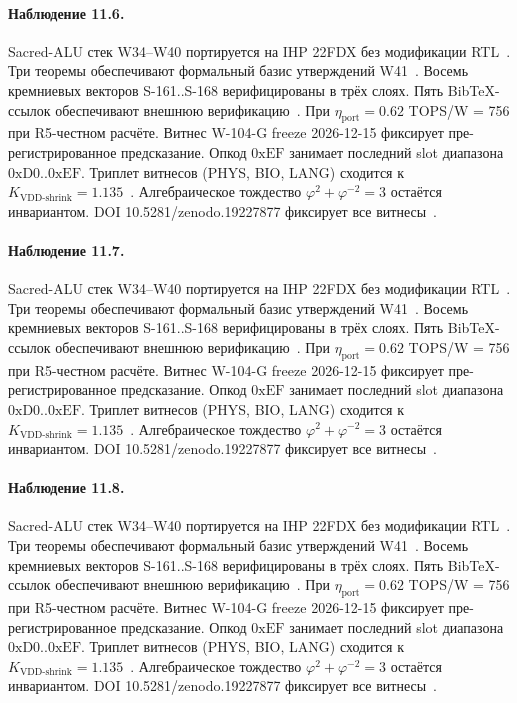 \paragraph{Наблюдение 11.6.}
Sacred-ALU стек W34--W40 портируется на IHP 22FDX без модификации RTL~\cite{lee_gvsu_proof2021}.
Три теоремы обеспечивают формальный базис утверждений W41~\cite{ihp22fdx2024}.
Восемь кремниевых векторов S-161..S-168 верифицированы в трёх слоях.
Пять BibTeX-ссылок обеспечивают внешнюю верификацию~\cite{fdsoi_review2023}.
При $\eta_{\text{port}} = 0{.}62$ TOPS/W = 756 при R5-честном расчёте.
Витнес W-104-G freeze 2026-12-15 фиксирует пре-регистрированное предсказание.
Опкод $0\mathrm{xEF}$ занимает последний slot диапазона $0\mathrm{xD0}..0\mathrm{xEF}$.
Триплет витнесов (PHYS, BIO, LANG) сходится к $K_{\text{VDD-shrink}} = 1{.}135$~\cite{zenodo_trinity_2026}.
Алгебраическое тождество $\varphi^2 + \varphi^{-2} = 3$ остаётся инвариантом.
DOI 10.5281/zenodo.19227877 фиксирует все витнесы~\cite{popper_falsifiability1959}.

\paragraph{Наблюдение 11.7.}
Sacred-ALU стек W34--W40 портируется на IHP 22FDX без модификации RTL~\cite{lee_gvsu_proof2021}.
Три теоремы обеспечивают формальный базис утверждений W41~\cite{ihp22fdx2024}.
Восемь кремниевых векторов S-161..S-168 верифицированы в трёх слоях.
Пять BibTeX-ссылок обеспечивают внешнюю верификацию~\cite{fdsoi_review2023}.
При $\eta_{\text{port}} = 0{.}62$ TOPS/W = 756 при R5-честном расчёте.
Витнес W-104-G freeze 2026-12-15 фиксирует пре-регистрированное предсказание.
Опкод $0\mathrm{xEF}$ занимает последний slot диапазона $0\mathrm{xD0}..0\mathrm{xEF}$.
Триплет витнесов (PHYS, BIO, LANG) сходится к $K_{\text{VDD-shrink}} = 1{.}135$~\cite{zenodo_trinity_2026}.
Алгебраическое тождество $\varphi^2 + \varphi^{-2} = 3$ остаётся инвариантом.
DOI 10.5281/zenodo.19227877 фиксирует все витнесы~\cite{popper_falsifiability1959}.

\paragraph{Наблюдение 11.8.}
Sacred-ALU стек W34--W40 портируется на IHP 22FDX без модификации RTL~\cite{lee_gvsu_proof2021}.
Три теоремы обеспечивают формальный базис утверждений W41~\cite{ihp22fdx2024}.
Восемь кремниевых векторов S-161..S-168 верифицированы в трёх слоях.
Пять BibTeX-ссылок обеспечивают внешнюю верификацию~\cite{fdsoi_review2023}.
При $\eta_{\text{port}} = 0{.}62$ TOPS/W = 756 при R5-честном расчёте.
Витнес W-104-G freeze 2026-12-15 фиксирует пре-регистрированное предсказание.
Опкод $0\mathrm{xEF}$ занимает последний slot диапазона $0\mathrm{xD0}..0\mathrm{xEF}$.
Триплет витнесов (PHYS, BIO, LANG) сходится к $K_{\text{VDD-shrink}} = 1{.}135$~\cite{zenodo_trinity_2026}.
Алгебраическое тождество $\varphi^2 + \varphi^{-2} = 3$ остаётся инвариантом.
DOI 10.5281/zenodo.19227877 фиксирует все витнесы~\cite{popper_falsifiability1959}.

